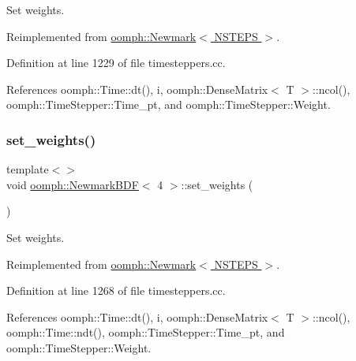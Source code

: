 Set weights. 



Reimplemented from \hyperlink{classoomph_1_1Newmark_ad175de47f064359fa319a11088b759aa}{oomph\+::\+Newmark$<$ N\+S\+T\+E\+P\+S $>$}.



Definition at line 1229 of file timesteppers.\+cc.



References oomph\+::\+Time\+::dt(), i, oomph\+::\+Dense\+Matrix$<$ T $>$\+::ncol(), oomph\+::\+Time\+Stepper\+::\+Time\+\_\+pt, and oomph\+::\+Time\+Stepper\+::\+Weight.

\mbox{\label{classoomph_1_1NewmarkBDF_a1fe8947081bc206ccf050fa643010036}} 
\subsubsection{\texorpdfstring{set\+\_\+weights()}{set\_weights()}\hspace{0.1cm}{\footnotesize\ttfamily [4/4]}}
{\footnotesize\ttfamily template$<$$>$ \\
void \hyperlink{classoomph_1_1NewmarkBDF}{oomph\+::\+Newmark\+B\+DF}$<$ 4 $>$\+::set\+\_\+weights (\begin{DoxyParamCaption}{ }\end{DoxyParamCaption})\hspace{0.3cm}{\ttfamily [virtual]}}



Set weights. 



Reimplemented from \hyperlink{classoomph_1_1Newmark_ad175de47f064359fa319a11088b759aa}{oomph\+::\+Newmark$<$ N\+S\+T\+E\+P\+S $>$}.



Definition at line 1268 of file timesteppers.\+cc.



References oomph\+::\+Time\+::dt(), i, oomph\+::\+Dense\+Matrix$<$ T $>$\+::ncol(), oomph\+::\+Time\+::ndt(), oomph\+::\+Time\+Stepper\+::\+Time\+\_\+pt, and oomph\+::\+Time\+Stepper\+::\+Weight.

\mbox{\label{classoomph_1_1NewmarkBDF_a86ac259d50e62295d13790a5fe49010d}} 
